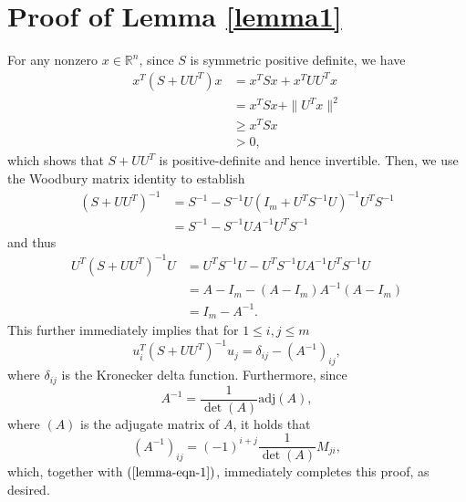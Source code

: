 \documentclass[12pt]{article}
\begin{document}
\section{Proof of Lemma \ref{lemma1}}\label{sec:proof_of_lemma_ref_lemma1}
For any nonzero $x\in \mathbb{R}^{n}$, since $S$ is symmetric positive definite, we have 
\begin{equation*}
\begin{aligned}
x^T (S + U U^T)x &= x^T S x + x^T U U^T x\\
&=x^T S x + \|U^T x  \|^2\\
&\geq x^T S x\\
&>0,
\end{aligned}
\end{equation*}
which shows that $S + U U^T$ is positive-definite and hence invertible. Then, we use the Woodbury matrix identity \cite{higham2002accuracy} to establish
\begin{equation*}
\begin{aligned}
(S +UU^T )^{-1} &= S^{-1} -S^{-1}U(I_m+U^T S^{-1} U)^{-1}U^T S^{-1}\\
&=S^{-1} - S^{-1}UA^{-1}U^T S^{-1}
\end{aligned}
\end{equation*}
and thus
\begin{equation*}
\begin{aligned}
U^T (S+U U^T)^{-1}U &= U^T S^{-1} U - U^T S^{-1} U A^{-1} U^T S^{-1}U\\
&=A-I_m -(A-I_m) A^{-1}(A-I_m)\\
&= I_m-A^{-1}.
\end{aligned}
\end{equation*}
This further immediately implies that for $1\le i,j\le m$
\begin{equation}\label{lemma-eqn-1}
u_i^T (S +UU^T)^{-1}u_j = \delta_{ij} - (A^{-1})_{ij},
\end{equation}
where $\delta_{ij}$ is the Kronecker delta function. Furthermore, since 
$$
A^{-1} = \frac{1}{\det(A)}\text{adj}(A),
$$
where $(A)$ is the adjugate matrix of $A$, it holds that 
$$
(A^{-1})_{ij} = (-1)^{i+j}\frac{1}{\det(A)} M_{ji},
$$
which, together with $(\ref{lemma-eqn-1})$, immediately completes this proof, as desired.
\end{document}
